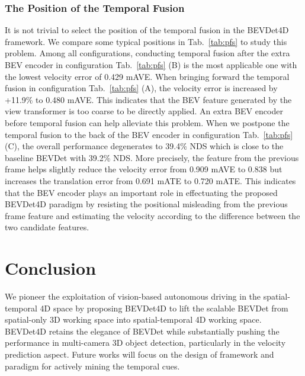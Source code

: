\documentclass[10pt,twocolumn,letterpaper]{article}
\begin{document}
\subsubsection{The Position of the Temporal Fusion}
It is not trivial to select the position of the temporal fusion in the BEVDet4D framework. We compare some typical positions in Tab.~\ref{tab:pfs} to study this problem. Among all configurations, conducting temporal fusion after the extra BEV encoder in configuration Tab.~\ref{tab:pfs} (B) is the most applicable one with the lowest velocity error of 0.429 mAVE.  When bringing forward the temporal fusion in configuration Tab.~\ref{tab:pfs} (A), the velocity error is increased by +11.9\% to 0.480 mAVE. This indicates that the BEV feature generated by the view transformer is too coarse to be directly applied. An extra BEV encoder before temporal fusion can help alleviate this problem. When we postpone the temporal fusion to the back of the BEV encoder in configuration Tab.~\ref{tab:pfs} (C), the overall performance degenerates to 39.4\% NDS which is close to the baseline BEVDet \cite{BEVDet} with 39.2\% NDS. More precisely, the feature from the previous frame helps slightly reduce the velocity error from 0.909 mAVE to 0.838 but increases the translation error from 0.691 mATE to 0.720 mATE. This indicates that the BEV encoder plays an important role in effectuating the proposed BEVDet4D paradigm by resisting the positional misleading from the previous frame feature and estimating the velocity according to the difference between the two candidate features.

\section{Conclusion}
We pioneer the exploitation of vision-based autonomous driving in the spatial-temporal 4D space by proposing BEVDet4D to lift the scalable BEVDet \cite{BEVDet} from spatial-only 3D working space into spatial-temporal 4D working space. BEVDet4D retains the elegance of BEVDet while substantially pushing the performance in multi-camera 3D object detection, particularly in the velocity prediction aspect. Future works will focus on the design of framework and paradigm for actively mining the temporal cues.

{\small


}
\end{document}
